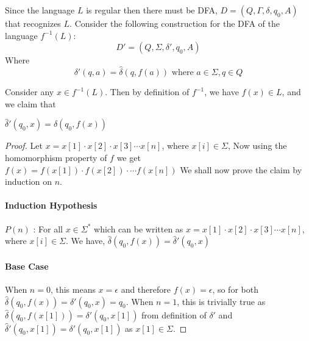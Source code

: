 \begin{soln}
	Since the language $L$ is regular then there must be DFA, $D = (Q, \Gamma, \delta, q_0, A)$ that recognizes $L$.
	Consider the following construction for the DFA of the language $f^{-1}(L)$:
	$$
		D' = (Q, \Sigma, \delta', q_0, A)
	$$
	Where
	$$
		\delta'(q,a)=\hat{\delta}(q,f(a)) \text{ where }a \in \Sigma, q \in Q
	$$

	Consider any $x \in f^{-1}(L)$. Then by definition of $f^{-1}$, we have $f(x) \in L$, and we claim that

	\begin{claim}
		$\hat\delta'(q_0,x) = \hat\delta(q_0,f(x))$
	\end{claim}
	\begin{proof}
		\newline Let $x=x[1]\cdot x[2]\cdot x[3] \cdots x[n]$, where $x[i] \in \Sigma$, Now using the homomorphism property of $f$ we get $f(x)=f(x[1])\cdot f(x[2])\cdot \cdots f(x[n])$  We shall now prove
		the claim by induction on $n$.

		\paragraph{Induction Hypothesis} $P(n)$ : For all $x\in \Sigma^*$ which can be written as $x=x[1]\cdot x[2]\cdot x[3] \cdots x[n]$, where $x[i] \in \Sigma$. We have, $\hat\delta(q_0,f(x))=\hat\delta'(q_0,x)$

		\paragraph{Base Case}
		When $n=0$, this means $x=\epsilon$ and therefore $f(x)=\epsilon$, so for both $\hat\delta(q_0,f(x))=\delta'(q_0,x)=q_0$. \newline
		When $n=1$, this is trivially true as $\hat\delta(q_0,f(x[1]))=\delta'(q_0,x[1])$ from definition of $\delta'$ and $\hat\delta'(q_0,x[1])=\delta'(q_0,x[1])$ as $x[1]\in \Sigma$.


\end{proof}
\end{soln}
